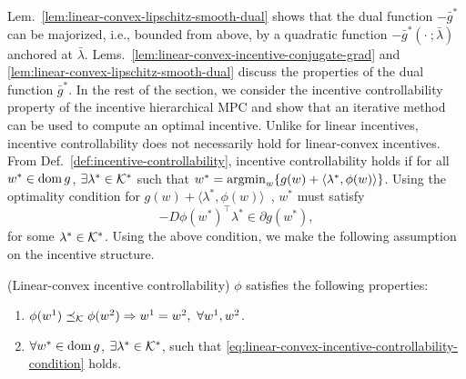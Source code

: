 Lem.~\ref{lem:linear-convex-lipschitz-smooth-dual} shows that the dual function $-\bar{g}^*$ can be majorized, i.e., bounded from above, by a quadratic function $-\bar{g}^*(\cdot \: ; \bar{\lambda})$ anchored at $\bar{\lambda}$.
Lems.~\ref{lem:linear-convex-incentive-conjugate-grad} and \ref{lem:linear-convex-lipschitz-smooth-dual} discuss the properties of the dual function $\bar{g}^*$.
In the rest of the section, we consider the incentive controllability property of the incentive hierarchical MPC and show that an iterative method can be used to compute an optimal incentive.
%
Unlike for linear incentives, incentive controllability does not necessarily hold for linear-convex incentives.
From Def.~\ref{def:incentive-controllability}, incentive controllability holds if for all $w^* \in \operatorname{dom}{g}$, $\exists \lambda^* \in \mathcal{K}^*$ such that $w^* = \operatorname*{argmin}_w \{g(w) + \langle \lambda^*, \phi(w)\rangle\}$.
Using the optimality condition for $g(w) + \langle \lambda^*, \phi(w)\rangle$~\cite[Thm.~23.8]{rockafellar1997convex}, $w^*$ must satisfy
\begin{equation}
\label{eq:linear-convex-incentive-controllability-condition}
    -D \phi(w^*)^\top \lambda^* \in \partial g(w^*),
\end{equation}
for some $\lambda^* \in \mathcal{K}^*$.
Using the above condition, we make the following assumption on the incentive structure.

\begin{assumption} (Linear-convex incentive controllability)
\label{assum:linear-convex-incentive-controllability}
$\phi$ satisfies the following properties:
\begin{enumerate}[leftmargin=*]
    \item $\phi(w^1) \preceq_{\mathcal{K}} \phi(w^2) \Rightarrow w^1 = w^2, \ \forall w^1, w^2$.

    \item $\forall w^* \in \operatorname{dom}{g}$, $\exists \lambda^* \in \mathcal{K}^*$, such that \eqref{eq:linear-convex-incentive-controllability-condition} holds.
\end{enumerate}
\end{assumption}

